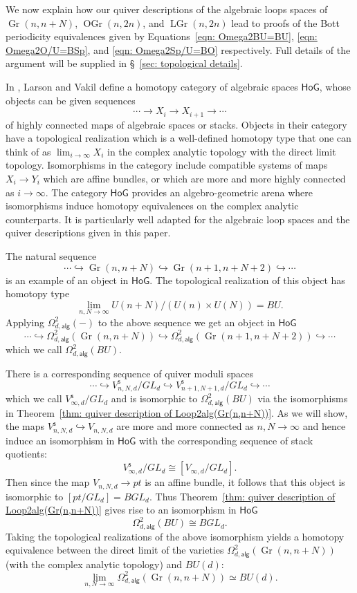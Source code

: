 \message{ !name(Bryan-Vakil.tex)}\documentclass{amsart}
\theoremstyle{definition}
\newcommand{\HoG}{\textsf{HoG}}
\newcommand{\alg}{\mathsf{alg}}
\newcommand{\stable}{\mathsf{s}}
\newcommand{\Gr}{\operatorname{Gr}}
\newcommand{\LGr}{\operatorname{LGr}}
\newcommand{\OGr}{\operatorname{OGr}}
\newcommand{\LoopTwo}{\Omega^{2}_{d,\alg}}
\newcommand{\homotopyeq}{\simeq}
\begin{document}
We now explain how our quiver descriptions of the algebraic loops
spaces of  $\Gr (n,n+N)$, $\OGr(n,2n)$, and $\LGr(n,2n)$
lead to proofs of the Bott periodicity equivalences given by
Equations~\eqref{eqn: Omega2BU=BU}, \eqref{eqn: Omega2O/U=BSp}, and
\eqref{eqn: Omega2Sp/U=BO} respectively. Full details of the argument
will be supplied in \S~\ref{sec: topological details}. 

In \cite{Larson-Vakil-BottPeriodicity}, Larson and Vakil define a
homotopy category of algebraic spaces $\HoG $, whose objects can be
given sequences
\[
\dotsb \to  X_{i} \to  X_{i+1}\to \dotsb 
\]
of highly connected maps of algebraic spaces or stacks. Objects in
their category have a topological realization which is a well-defined
homotopy type that one can think of as $\lim_{i\to \infty} X_{i}$ in
the complex analytic topology with the direct limit
topology. Isomorphisms in the category include compatible systems of
maps $X_{i} \to Y_{i}$ which are affine bundles, or which are more and
more highly connected as $i\to \infty$. The category $\HoG$ provides
an algebro-geometric arena where isomorphisms induce homotopy
equivalences on the complex analytic counterparts. It is particularly
well adapted for the algebraic loop spaces and the quiver descriptions
given in this paper.

The natural sequence
\[
\dotsb \hookrightarrow \Gr (n,n+N)\hookrightarrow \Gr
(n+1,n+N+2)\hookrightarrow \dotsb
\]
is an example of an object in $\HoG$. The topological realization of
this object has homotopy type
\[
\lim_{n,N\to \infty} U(n+N)/(U(n)\times U(N)) = BU.
\]
Applying $\LoopTwo (-)$ to the above sequence we get an object in
$\HoG$ 
\[
\dotsb \hookrightarrow \LoopTwo (\Gr (n,n+N))\hookrightarrow \LoopTwo (\Gr (n+1,n+N+2))\hookrightarrow \dotsb 
\]
which we call $\LoopTwo (BU)$.

There is a corresponding sequence of quiver moduli spaces
\[
\dotsb \hookrightarrow V^{\stable}_{n,N,d}/GL_{d} \hookrightarrow
V^{\stable}_{n+1,N+1,d}/GL_{d} \hookrightarrow\dotsb
\]
which we call $V^{\stable}_{\infty ,d}/GL_{d}$ and is isomorphic to
$\LoopTwo (BU)$ via the isomorphisms in Theorem~\ref{thm: quiver
description of Loop2alg(Gr(n,n+N))}. As we will show, the
maps $V^{\stable}_{n,N,d}\hookrightarrow V_{n,N,d}$ are more and more
connected as $n,N\to \infty$ and hence induce an isomorphism in $\HoG $ with the
corresponding sequence of stack quotients:
\[
V^{\stable}_{\infty ,d}/GL_{d} \cong [V_{\infty ,d} / GL_{d}] .
\]
Then since the map $V_{n,N,d}\to pt$ is an affine bundle, it follows
that this object is isomorphic to $[pt/GL_{d}] =BGL_{d}$. Thus
Theorem~\ref{thm: quiver description of Loop2alg(Gr(n,n+N))} gives
rise to an isomorphism in $\HoG$
\[
\LoopTwo (BU)\cong BGL_{d}. 
\]
Taking the topological realizations of the above isomorphism yields a
homotopy equivalence between the direct limit of the varieties $\LoopTwo
(\Gr (n,n+N))$ (with the complex analytic topology) and $BU(d)$:
\[
\lim_{n,N\to \infty} \LoopTwo (\Gr (n,n+N)) \homotopyeq BU(d).
\]
\end{document}

